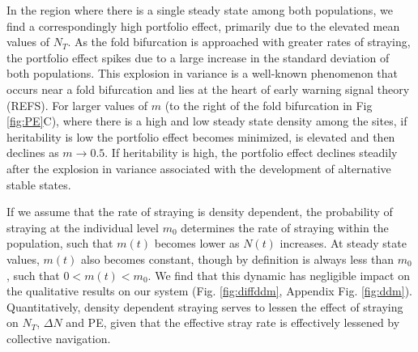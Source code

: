 \documentclass[twocolumn,preprintnumbers,amsmath,amssymb,superscriptaddress]{revtex4}
\begin{document}
In the region where there is a single steady state among both populations, we find a correspondingly high portfolio effect, primarily due to the elevated mean values of $N_T$.
As the fold bifurcation is approached with greater rates of straying, the portfolio effect spikes due to a large increase in the standard deviation of both populations.
This explosion in variance is a well-known phenomenon that occurs near a fold bifurcation and lies at the heart of early warning signal theory (REFS).
For larger values of $m$ (to the right of the fold bifurcation in Fig \ref{fig:PE}C), where there is a high and low steady state density among the sites, if heritability is low the portfolio effect becomes minimized, is elevated and then declines as $m\rightarrow 0.5$.
If heritability is high, the portfolio effect declines steadily after the explosion in variance associated with the development of alternative stable states.



If we assume that the rate of straying is density dependent, the probability of straying at the individual level $m_0$ determines the rate of straying within the population, such that $m(t)$ becomes lower as $N(t)$ increases.
At steady state values, $m(t)$ also becomes constant, though by definition is always less than $m_0$, such that $0 < m(t) < m_0$.
We find that this dynamic has negligible impact on the qualitative results on our system (Fig. \ref{fig:diffddm}, Appendix Fig. \ref{fig:ddm}).
Quantitatively, density dependent straying serves to lessen the effect of straying on $N_T$, $\Delta N$ and PE, given that the effective stray rate is effectively lessened by collective navigation.
\end{document}

